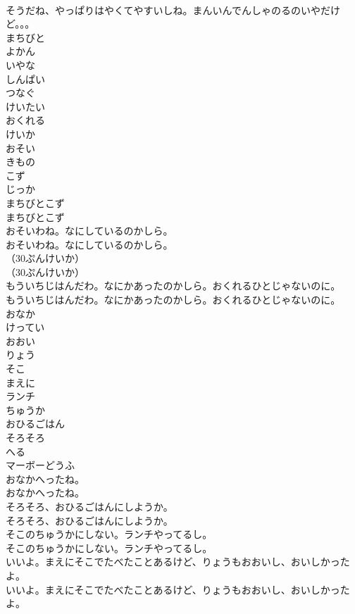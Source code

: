 \documentclass[8pt]{extreport}
\begin{document}
\begin{CJK}{UTF8}{min}
\\	そうだね、やっぱりはやくてやすいしね。まんいんでんしゃのるのいやだけど。。。 
\\	まちびと
\\	よかん
\\	いやな
\\	しんぱい
\\	つなぐ
\\	けいたい
\\	おくれる
\\	けいか
\\	おそい
\\	きもの
\\	こず
\\	じっか
\\	まちびとこず	
\\	まちびとこず 
\\	おそいわね。なにしているのかしら。	
\\	おそいわね。なにしているのかしら。 
\\	（30ぷんけいか）	
\\	（30ぷんけいか） 
\\	もういちじはんだわ。なにかあったのかしら。おくれるひとじゃないのに。	
\\	もういちじはんだわ。なにかあったのかしら。おくれるひとじゃないのに。 
\\	おなか
\\	けってい
\\	おおい
\\	りょう
\\	そこ
\\	まえに
\\	ランチ
\\	ちゅうか
\\	おひるごはん
\\	そろそろ
\\	へる
\\	マーボーどうふ
\\	おなかへったね。	
\\	おなかへったね。 
\\	そろそろ、おひるごはんにしようか。	
\\	そろそろ、おひるごはんにしようか。 
\\	そこのちゅうかにしない。ランチやってるし。	
\\	そこのちゅうかにしない。ランチやってるし。 
\\	いいよ。まえにそこでたべたことあるけど、りょうもおおいし、おいしかったよ。	
\\	いいよ。まえにそこでたべたことあるけど、りょうもおおいし、おいしかったよ。 

\end{CJK}
\end{document}
